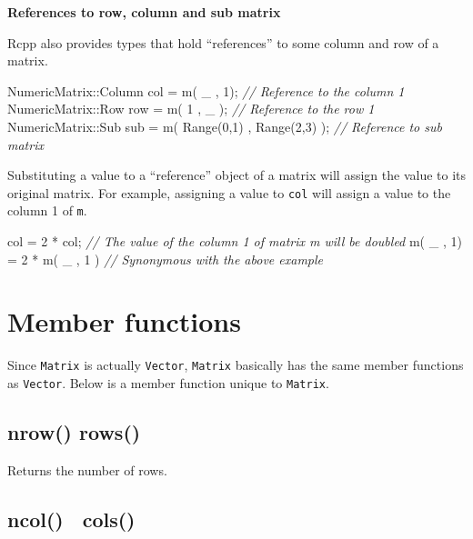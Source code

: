 \documentclass[]{book}
\newenvironment{Shaded}{\begin{snugshade}}{\end{snugshade}}
\newcommand{\DecValTok}[1]{\textcolor[rgb]{0.00,0.00,0.81}{#1}}
\newcommand{\CommentTok}[1]{\textcolor[rgb]{0.56,0.35,0.01}{\textit{#1}}}
\newcommand{\NormalTok}[1]{#1}
\theoremstyle{definition}
\theoremstyle{definition}
\theoremstyle{remark}
\begin{document}
\textbf{References to row, column and sub matrix}

Rcpp also provides types that hold ``references'' to some column and row
of a matrix.

\begin{Shaded}
\begin{Highlighting}[]
\NormalTok{NumericMatrix::Column col = m( _ , }\DecValTok{1}\NormalTok{);  }\CommentTok{// Reference to the column 1}
\NormalTok{NumericMatrix::Row    row = m( }\DecValTok{1}\NormalTok{ , _ ); }\CommentTok{// Reference to the row 1}
\NormalTok{NumericMatrix::Sub    sub = m( Range(}\DecValTok{0}\NormalTok{,}\DecValTok{1}\NormalTok{) , Range(}\DecValTok{2}\NormalTok{,}\DecValTok{3}\NormalTok{) ); }\CommentTok{// Reference to sub matrix}
\end{Highlighting}
\end{Shaded}

Substituting a value to a ``reference'' object of a matrix will assign
the value to its original matrix. For example, assigning a value to
\texttt{col} will assign a value to the column 1 of \texttt{m}.

\begin{Shaded}
\begin{Highlighting}[]
\NormalTok{col = }\DecValTok{2}\NormalTok{ * col;             }\CommentTok{// The value of the column 1 of matrix m will be doubled}
\NormalTok{m( _ , }\DecValTok{1}\NormalTok{) = }\DecValTok{2}\NormalTok{ * m( _ , }\DecValTok{1}\NormalTok{ ) }\CommentTok{// Synonymous with the above example}
\end{Highlighting}
\end{Shaded}

\section{Member functions}\label{member-functions-1}

Since \texttt{Matrix} is actually \texttt{Vector}, \texttt{Matrix}
basically has the same member functions as \texttt{Vector}. Below is a
member function unique to \texttt{Matrix}.

\subsection{nrow() rows()}\label{nrow-rows}

Returns the number of rows.

\subsection{ncol()　cols()}\label{ncolcols}
\end{document}
